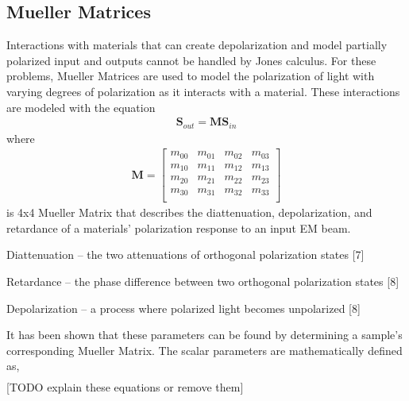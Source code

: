 \subsection{Mueller Matrices}
Interactions with materials that can create depolarization and model partially polarized input and outputs cannot be handled by Jones calculus.  For these problems, Mueller Matrices are used to model the polarization of light with varying degrees of polarization as it interacts with a material.  These interactions are modeled with the equation
\begin{align}
    \mathbf{S}_{out} = \mathbf{M}\mathbf{S}_{in}
\end{align}
%
where
%
\begin{align}
    \mathbf{M} =
    \begin{bmatrix}
        m_{00} & m_{01} & m_{02} & m_{03} \\
        m_{10} & m_{11} & m_{12} & m_{13} \\
        m_{20} & m_{21} & m_{22} & m_{23} \\
        m_{30} & m_{31} & m_{32} & m_{33} \\
    \end{bmatrix}
\end{align}
%
is 4x4 Mueller Matrix that describes the diattenuation, depolarization, and retardance of a materials' polarization response to an input EM beam.

Diattenuation – the two attenuations of orthogonal polarization states [7]

Retardance – the phase difference between two orthogonal polarization states [8]

Depolarization – a process where polarized light becomes unpolarized [8]

It has been shown that these parameters can be found by determining a sample's corresponding Mueller Matrix. The scalar parameters are mathematically defined as,
\begin{align}
\end{align}
[TODO explain these equations or remove them]

